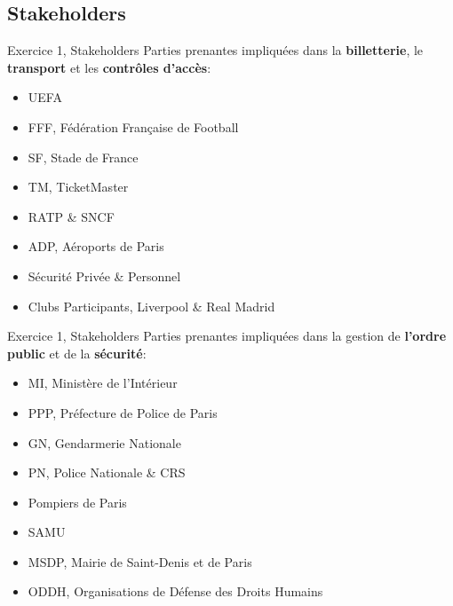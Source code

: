 \documentclass[aspectratio=1610]{beamer}
\begin{document}
    \subsection{Stakeholders}
    \begin{frame}{Exercice 1, Stakeholders}
        Parties prenantes impliquées dans la \textbf{billetterie}, le \textbf{transport} et les \textbf{contrôles d'accès}:
        \begin{itemize}[noitemsep]
            \item UEFA
            \item FFF, Fédération Française de Football
            \item SF, Stade de France
            \item TM, TicketMaster
            \item RATP \& SNCF
            \item ADP, Aéroports de Paris
            \item Sécurité Privée \& Personnel
            \item Clubs Participants, Liverpool \& Real Madrid
        \end{itemize}
    \end{frame}
    \begin{frame}{Exercice 1, Stakeholders}
        Parties prenantes impliquées dans la gestion de \textbf{l'ordre public} et de la \textbf{sécurité}:
        \begin{itemize}[noitemsep]
            \item MI, Ministère de l'Intérieur
            \item PPP, Préfecture de Police de Paris
            \item GN, Gendarmerie Nationale
            \item PN, Police Nationale \& CRS
            \item Pompiers de Paris
            \item SAMU
            \item MSDP, Mairie de Saint-Denis et de Paris
            \item ODDH, Organisations de Défense des Droits Humains
        \end{itemize}
    \end{frame}
\end{document}
